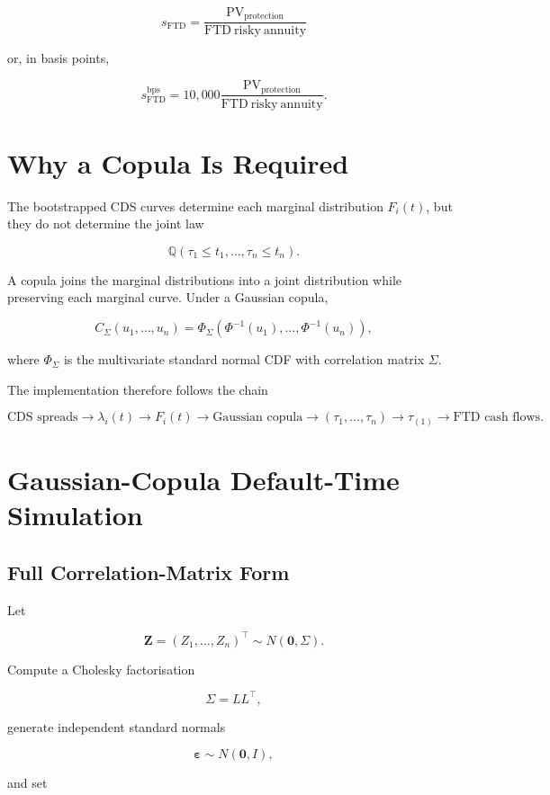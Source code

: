 \documentclass[11pt,a4paper]{article}
\newcommand{\Q}{\mathbb{Q}}
\newcommand{\FTD}{\mathrm{FTD}}
\newcommand{\PV}{\mathrm{PV}}
\begin{document}
\[
\boxed{
s_{\FTD}
=
\frac{\PV_{\mathrm{protection}}}
{\mathrm{FTD\ risky\ annuity}}
}
\]

or, in basis points,

\[
s_{\FTD}^{\mathrm{bps}}
=
10{,}000
\frac{\PV_{\mathrm{protection}}}
{\mathrm{FTD\ risky\ annuity}}.
\]

\section{Why a Copula Is Required}

The bootstrapped CDS curves determine each marginal distribution $F_i(t)$, but they do not determine the joint law

\[
\Q(\tau_1\leq t_1,\ldots,\tau_n\leq t_n).
\]

A copula joins the marginal distributions into a joint distribution while preserving each marginal curve. Under a Gaussian copula,

\[
C_{\Sigma}(u_1,\ldots,u_n)
=
\Phi_{\Sigma}
\left(
\Phi^{-1}(u_1),\ldots,\Phi^{-1}(u_n)
\right),
\]

where $\Phi_{\Sigma}$ is the multivariate standard normal CDF with correlation matrix $\Sigma$.

The implementation therefore follows the chain

\[
\text{CDS spreads}
\rightarrow
\lambda_i(t)
\rightarrow
F_i(t)
\rightarrow
\text{Gaussian copula}
\rightarrow
(\tau_1,\ldots,\tau_n)
\rightarrow
\tau_{(1)}
\rightarrow
\text{FTD cash flows}.
\]

\section{Gaussian-Copula Default-Time Simulation}

\subsection{Full Correlation-Matrix Form}

Let

\[
\mathbf Z=(Z_1,\ldots,Z_n)^\top
\sim N(\mathbf 0,\Sigma).
\]

Compute a Cholesky factorisation

\[
\Sigma=LL^\top,
\]

generate independent standard normals

\[
\boldsymbol{\varepsilon}\sim N(\mathbf 0,I),
\]

and set
\end{document}
